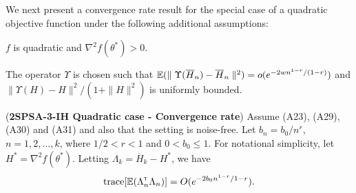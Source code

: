 We next present a convergence rate result for the special case of a quadratic objective function under the following additional assumptions:
\begin{pvn}
\item  $f$ is quadratic and $\nabla^2 f(\theta^*) > 0$. 
\item The operator $\Upsilon$ is chosen such that $\mathbb{E}(\parallel \Upsilon(\overline H_n) - \overline H_n\parallel^2) = o(e^{-2wn^{1-r}/(1-r)})$ and \\$\parallel \Upsilon(H) - H \parallel^2 / (1+\parallel H \parallel^2)$ is uniformly bounded.
\end{pvn}
\begin{theorem}(\textbf{2SPSA-3-IH Quadratic case - Convergence rate})
\label{thm:spsaquad-bound}
Assume (A23), (A29), (A30) and (A31) and also that the setting is noise-free. 
Let $b_n = b_0/n^r$, $n=1,2,\ldots,k$, where $1/2 < r < 1$ and $0 < b_0 \leq 1$. For notational simplicity, let $H^*=\nabla^2 f(\theta^*)$. Letting $\Lambda_k = \overline H_k - H^*$, we have 
\begin{align}
\text{trace}[\mathbb{E} (\Lambda_n ^\mathsf{\scriptscriptstyle T} \Lambda_n)] = O(e^{-2b_0n^{1-r} / {1-r}}).
\label{eq:spsaquad-bigo}
\end{align}
\end{theorem}
